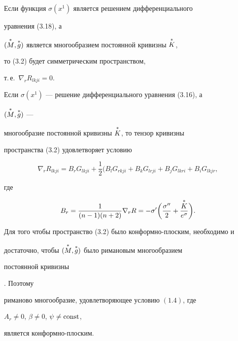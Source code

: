  


\begin{notes} 


Если функция $\sigma(x^1)$ является решением дифференциального 


уравнения (3.18), а 


$(\overset{*}{M}{},\overset{*}{g}{})$ является многообразием постоянной кривизны $\overset{*}{K}{}$, 


то (3.2) будет симметрическим пространством, 


т.\,е.~$\nabla_r R_{lkji}=0$. 


 


Если $\sigma(x^1)$ --- решение дифференциального уравнения (3.16), а 


$(\overset{*}{M}{},\overset{*}{g}{})$ --- 


многообразие постоянной кривизны $\overset{*}{K}{}$, то тензор кривизны 


пространства (3.2) удовлетворяет условию 


$$ 


\nabla_r R_{lkji}=B_r G_{lkji}+\frac{1}{2} 


(B_l G_{rkji}+B_k G_{lrji}+B_j G_{lkri}+ 


B_i G_{lkjr}, 


$$ 


где 


$$ 


B_r=\frac{1}{(n-1)(n+2)}\nabla_r R=-\sigma'\bigg( 


\frac{\sigma''}{2}+\frac{\up{K}}{e^\sigma}\bigg). 


$$ 


\end{notes} 


 


\begin{notes} 


Для того чтобы пространство (3.2) было конформно-плоским, необходимо и 


достаточно, чтобы $(\overset{*}{M}{},\overset{*}{g}{})$ было римановым многообразием 


постоянной кривизны 


\cite{17}. Поэтому 


{\it 


риманово многообразие, удовлетворяющее условию $(1.4)$, где 


$A_r\ne 0$, $\beta\ne 0$, $\psi\ne\operatorname{const}$, 


является конформно-плоским. 


} 


\end{notes} 


